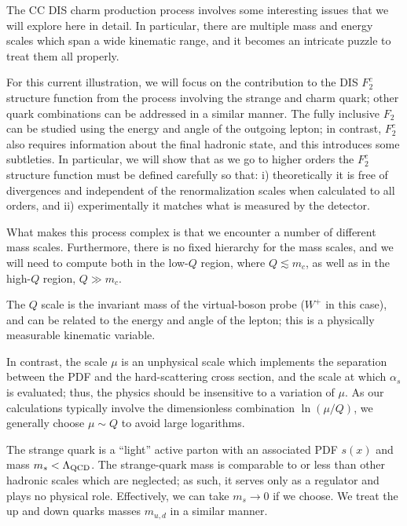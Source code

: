 %
The CC DIS charm production process involves some interesting issues
that we will explore here in detail. In particular, there are multiple
mass and energy scales which span a wide kinematic range, and it
becomes an intricate puzzle to treat them all properly.

For this current illustration, we will focus on the contribution to
the DIS $F_{2}^{c}$ structure function from the process involving the
strange and charm quark; other quark combinations can be addressed in
a similar manner.
%
The fully inclusive $F_2$ can be studied using the energy and angle of
the outgoing lepton; in contrast, $F_{2}^{c}$ also requires
information about the final hadronic state, and this introduces some
subtleties.
%
In particular, we will show that as we go to higher orders the
$F_{2}^{c}$ structure function must be defined carefully so that: i)
theoretically it is free of divergences and independent of the
renormalization scales when calculated to all orders, 
and ii) experimentally it matches what is
measured by the detector.

%
What makes this process complex is that we encounter a number of
different mass scales. Furthermore, there is no fixed hierarchy for
the mass scales, and we will need to compute both in the low-$Q$
region, where $Q\lesssim m_{c}$, as well as in the high-$Q$ region,
$Q\gg m_{c}$.

The $Q$ scale is the invariant mass of the virtual-boson probe
($W^{+}$ in this case), and can be related to the energy and angle of
the lepton; this is a physically measurable kinematic variable.

In contrast, the scale $\mu$ is an unphysical scale which implements
the separation between the PDF and the hard-scattering cross section, 
and the scale at which $\alpha_{s}$ is evaluated;
thus, the physics should be insensitive to a variation of $\mu$. As
our calculations typically involve the dimensionless combination
$\ln(\mu/Q)$, we generally choose $\mu\sim Q$ to avoid large
logarithms.

The strange quark is a ``light'' active parton with an associated PDF
$s(x)$ and mass $m_{s} < \Lambda_{\rm QCD}$. The strange-quark mass is
comparable to or less than other hadronic scales which are neglected;
as such, it serves only as a regulator and plays no physical
role. Effectively, we can take $m_{s}\to 0$ if we choose.
%
We treat the up and down quarks masses $m_{u,d}$ in a similar manner.

